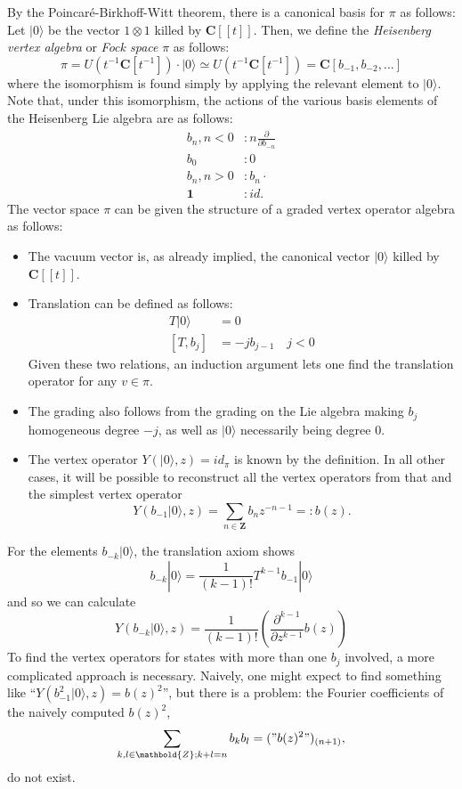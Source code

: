 \documentclass{article}
\newcommand{\CC}{\mathbold{C}}
\newcommand{\ZZ}{\mathbold{Z}}
\newcommand{\vac}{|0\rangle}
\newcommand{\one}{\mathbold{1}}
\begin{document}
By the Poincaré-Birkhoff-Witt theorem, there is a canonical basis for $\pi$ as follows: Let $\vac$ be the vector $1 \otimes 1$ killed by $\CC[[t]]$.  Then, we define the \textit{Heisenberg vertex algebra} or \textit{Fock space} $\pi$ as follows: 
\[\pi = U(t^{-1}\CC[t^{-1}])\cdot \vac \simeq U(t^{-1}\CC[t^{-1}])=\CC[b_{-1},b_{-2},...]  \]
where the isomorphism is found simply by applying the relevant element to $\vac$.  Note that, under this isomorphism, the actions of the various basis elements of the Heisenberg Lie algebra are as follows:
\begin{align}
  b_n, n<0&: n\frac{\partial}{\partial b_{-n}}\\
  b_0&:0\\
  b_{n},n>0&:b_n \cdot\\
  \one&:id.
\end{align}
The vector space $\pi$ can be given the structure of a graded vertex operator algebra as follows:
\begin{itemize}
\item The vacuum vector is, as already implied, the canonical vector $\vac$ killed by $\CC[[t]]$.
\item Translation can be defined as follows:
  \begin{align*}
    T\vac&=0\\
    [T,b_j]&=-jb_{j-1}\quad j<0
  \end{align*}
  Given these two relations, an induction argument lets one find the translation operator for any $v \in \pi$.
\item The grading also follows from the grading on the Lie algebra making $b_j$ homogeneous degree $-j$, as well as $\vac$ necessarily being degree $0$.
\item The vertex operator $Y(\vac,z)=id_\pi$ is known by the definition.  In all other cases, it will be possible to reconstruct all the vertex operators from that and the simplest vertex operator
\[Y(b_{-1}\vac,z)=\sum_{n \in \ZZ}b_nz^{-n-1}=:b(z).\]
\end{itemize}
For the elements $b_{-k} \vac$, the translation axiom shows
\[b_{-k} \vac = \frac{1}{(k-1)!}T^{k-1}b_{-1}\vac \]
and so we can calculate
\[Y(b_{-k}\vac,z)=\frac{1}{(k-1)!}\left(\frac{\partial^{k-1}}{\partial z^{k-1}} b(z) \right) \]
To find the vertex operators for states with more than one $b_j$ involved, a more complicated approach is necessary.  Naively, one might expect to find something like ``$Y(b_{-1}^2\vac,z)=b(z)^2$'', but there is a problem: the Fourier coefficients of the naively computed $b(z)^2$,
\[\sum_{k,l \in \ZZ; k+l=n}b_kb_l=("b(z)^2")_{(n+1)}, \]
do not exist.
\end{document}
